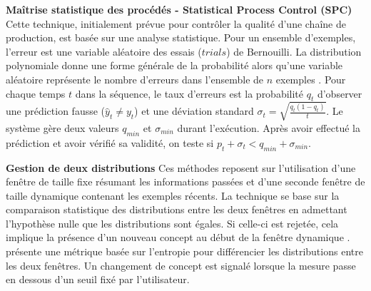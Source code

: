 \documentclass[utf8]{stageM2R} %
\theoremstyle{remark}
\renewcommand{\emph}{\textbf}
\begin{document}
 \textbf{Maîtrise statistique des procédés - Statistical Process Control (SPC)}
Cette technique, initialement prévue pour contrôler la qualité d'une chaîne de production, est basée sur une analyse statistique. Pour un ensemble d'exemples, l'erreur est une variable aléatoire des essais ($trials$) de Bernouilli. La distribution polynomiale donne une forme générale de la probabilité alors qu'une variable aléatoire représente le nombre d'erreurs dans l'ensemble de $n$ exemples \cite{Klinkenberg1998}. Pour chaque temps $t$ dans la séquence, le taux d'erreurs est la probabilité $q_t$ d'observer une prédiction fausse ($\widehat{y}_t \ne y_t$) et une déviation standard $\sigma_t = \sqrt{\frac{q_t(1-q_t)}{t}}$.
Le système gère deux valeurs $q_{min}$ et $\sigma_{min}$ durant l'exécution. Après avoir effectué la prédiction et avoir vérifié sa validité, on teste si $p_{t} + \sigma_{t} < q_{min} + \sigma_{min}$.
%

 \textbf{Gestion de deux distributions}
Ces méthodes reposent sur l'utilisation d'une fenêtre de taille fixe résumant les informations passées et d'une seconde fenêtre de taille dynamique contenant les exemples récents. La technique se base sur la comparaison statistique des distributions entre les deux fenêtres en admettant l'hypothèse nulle que les distributions sont égales.
Si celle-ci est rejetée, cela implique la présence d'un nouveau concept au début de la fenêtre dynamique  \cite{Kifer2004}.
\cite{Vorburger2006} présente une métrique basée sur l'entropie pour différencier les distributions entre les deux fenêtres. Un changement de concept est signalé lorsque la mesure passe en dessous d'un seuil fixé par l'utilisateur.
\end{document}
